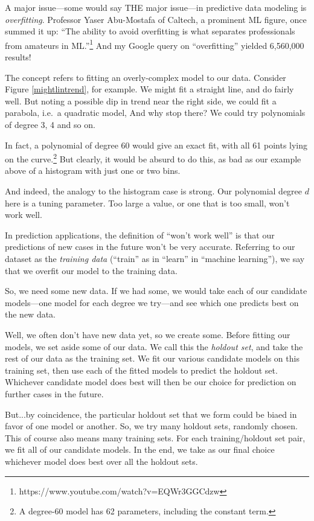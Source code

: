 A major issue---some would say THE major issue---in predictive
data modeling is \textit{overfitting}.  Professor Yaser
Abu-Mostafa of Caltech, a prominent ML figure, once summed it up: ``The
ability to avoid overfitting is what separates professionals from
amateurs in ML.''\footnote{https://www.youtube.com/watch?v=EQWr3GGCdzw}
And my Google query on ``overfitting'' yielded 6,560,000 results!

The concept refers to fitting an overly-complex model to our data.
Consider Figure \ref{mightlintrend}, for example.  We might fit a
straight line, and do fairly well.  But noting a possible dip in trend
near the right side, we could fit a parabola, i.e.\  a quadratic model,
And why stop there?  We could try polynomials of degree 3, 4 and so on.

In fact, a polynomial of degree 60 would give an exact fit, with all 61
points lying on the curve.\footnote{A degree-60 model has 62 parameters,
including the constant term.} But clearly, it would be absurd to do
this, as bad as our example above of a histogram with just one or two
bins.

And indeed, the analogy to the histogram case is strong.  Our polynomial
degree $d$ here is a tuning parameter.  Too large a value, or one that
is too small, won't work well.

In prediction applications, the definition of ``won't work well'' is
that our predictions of new cases in the future won't be very accurate.
Referring to our dataset as the \textit{training data} (``train'' as in
``learn'' in ``machine learning''), we say that we overfit our model to
the training data.  

So, we need some new data.  If we had some, we would take each of our
candidate models---one model for each degree we try---and see which
one predicts best on the new data.

Well, we often don't have new data yet, so we create some.  Before
fitting our models, we set aside some of our data.  We call this the
\textit{holdout set}, and take the rest of our data as the training set.
We fit our various candidate models on this training set, then use each
of the fitted models to predict the holdout set.  Whichever candidate
model does best will then be our choice for prediction on further cases
in the future.

But...by coincidence, the particular holdout set that we form could be
biaed in favor of one model or another.  So, we try many holdout sets,
randomly chosen.  This of course also means many training sets.  For
each training/holdout set pair, we fit all of our candidate models.  In
the end, we take as our final choice whichever model does best over all
the holdout sets.

